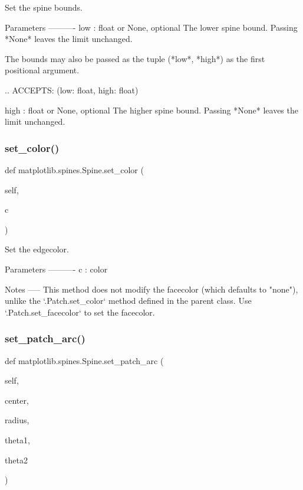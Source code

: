 \begin{DoxyVerb}Set the spine bounds.

Parameters
----------
low : float or None, optional
    The lower spine bound. Passing *None* leaves the limit unchanged.

    The bounds may also be passed as the tuple (*low*, *high*) as the
    first positional argument.

    .. ACCEPTS: (low: float, high: float)

high : float or None, optional
    The higher spine bound. Passing *None* leaves the limit unchanged.
\end{DoxyVerb}
 \mbox{\label{classmatplotlib_1_1spines_1_1Spine_afe8c85bc9f4226c1095d2066b4e58d28}} 
\subsubsection{\texorpdfstring{set\+\_\+color()}{set\_color()}}
{\footnotesize\ttfamily def matplotlib.\+spines.\+Spine.\+set\+\_\+color (\begin{DoxyParamCaption}\item[{}]{self,  }\item[{}]{c }\end{DoxyParamCaption})}

\begin{DoxyVerb}Set the edgecolor.

Parameters
----------
c : color

Notes
-----
This method does not modify the facecolor (which defaults to "none"),
unlike the `.Patch.set_color` method defined in the parent class.  Use
`.Patch.set_facecolor` to set the facecolor.
\end{DoxyVerb}
 \mbox{\label{classmatplotlib_1_1spines_1_1Spine_a1fbe5a277ef167582b7f1a90b96cce12}} 
\subsubsection{\texorpdfstring{set\+\_\+patch\+\_\+arc()}{set\_patch\_arc()}}
{\footnotesize\ttfamily def matplotlib.\+spines.\+Spine.\+set\+\_\+patch\+\_\+arc (\begin{DoxyParamCaption}\item[{}]{self,  }\item[{}]{center,  }\item[{}]{radius,  }\item[{}]{theta1,  }\item[{}]{theta2 }\end{DoxyParamCaption})}


